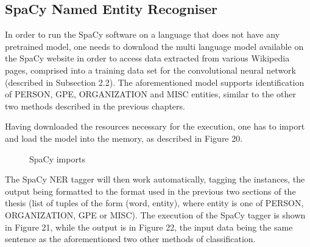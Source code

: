 \documentclass[12pt,a4paper]{article}
\begin{document}
\subsection{SpaCy Named Entity Recogniser}

\qquad \quad In order to run the SpaCy software on a language that does not have any pretrained model, one needs to download the multi language model available on the SpaCy website in order to access data extracted from various Wikipedia pages, comprised into a training data set for the convolutional neural network (described in Subsection 2.2). The aforementioned model supports identification of PERSON, GPE, ORGANIZATION and MISC entities, similar to the other two methods described in the previous chapters.

\qquad Having downloaded the resources necessary for the execution, one has to import and load the model into the memory, as described in Figure 20.

\begin{figure}[h!]
\begin{center}
\end{center}
\caption{SpaCy imports}
\end{figure}

\qquad The SpaCy NER tagger will then work automatically, tagging the instances, the output being formatted to the format used in the previous two sections of the thesis (list of tuples of the form (word, entity), where entity is one of PERSON, ORGANIZATION, GPE or MISC). The execution of the SpaCy tagger is shown in Figure 21, while the output is in Figure 22, the input data being the same sentence as the aforementioned two other methods of classification.
\end{document}
